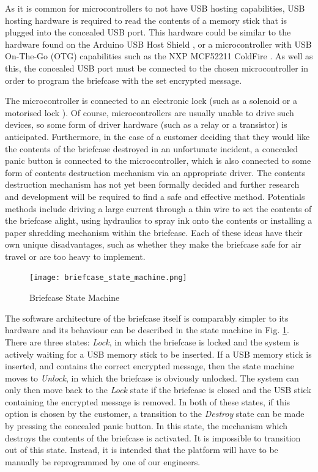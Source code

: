 As it is common for microcontrollers to not have USB hosting capabilities, USB hosting hardware is required to read the contents of a memory stick that is plugged into the concealed USB port. This hardware could be similar to the hardware found on the Arduino USB Host Shield \cite{arduinoUSBHost}, or a microcontroller with USB On-The-Go (OTG) capabilities \cite{techopediaUSBOTG} such as the NXP MCF52211 ColdFire \cite{nxpDatasheet}. As well as this, the concealed USB port must be connected to the chosen microcontroller in order to program the briefcase with the set encrypted message.

The microcontroller is connected to an electronic lock (such as a solenoid \cite{solenoidDigikey} or a motorised lock \cite{motorisedLock}). Of course, microcontrollers are usually unable to drive such devices, so some form of driver hardware (such as a relay or a transistor) is anticipated. Furthermore, in the case of a customer deciding that they would like the contents of the briefcase destroyed in an unfortunate incident, a concealed panic button is connected to the microcontroller, which is also connected to some form of contents destruction mechanism via an appropriate driver. The contents destruction mechanism has not yet been formally decided and further research and development will be required to find a safe and effective method. Potentials methods include driving a large current through a thin wire to set the contents of the briefcase alight, using hydraulics to spray ink onto the contents or installing a paper shredding mechanism within the briefcase. Each of these ideas have their own unique disadvantages, such as whether they make the briefcase safe for air travel or are too heavy to implement.

\begin{figure}[h]
    \centering
    \texttt{[image: briefcase\_state\_machine.png]}
    \caption{Briefcase State Machine}
    \label{fig:briefcase_state_machine}
\end{figure}
The software architecture of the briefcase itself is comparably simpler to its hardware and its behaviour can be described in the state machine in Fig. \ref{fig:briefcase_state_machine}. There are three states: \textit{Lock}, in which the briefcase is locked and the system is actively waiting for a USB memory stick to be inserted. If a USB memory stick is inserted, and contains the correct encrypted message, then the state machine moves to \textit{Unlock}, in which the briefcase is obviously unlocked. The system can only then move back to the \textit{Lock} state if the briefcase is closed and the USB stick containing the encrypted message is removed. In both of these states, if this option is chosen by the customer, a transition to the \textit{Destroy} state can be made by pressing the concealed panic button. In this state, the mechanism which destroys the  contents of the briefcase is activated. It is impossible to transition out of this state. Instead, it is intended that the platform will have to be manually be reprogrammed by one of our engineers. 